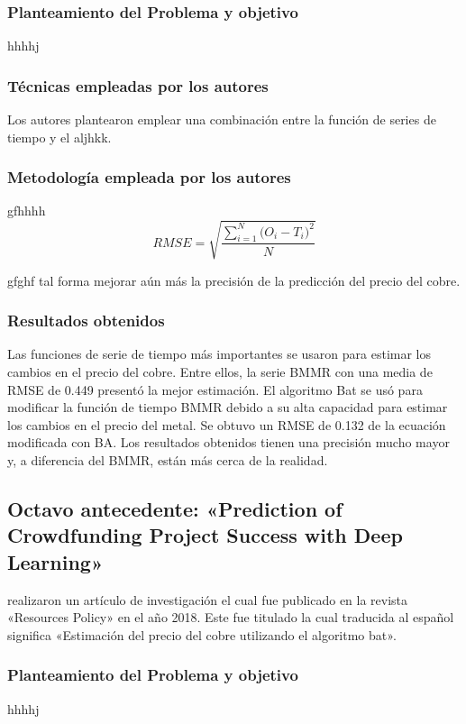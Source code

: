\subsubsection{Planteamiento del Problema y objetivo }
hhhhj

\subsubsection{Técnicas empleadas por los autores}
Los autores plantearon emplear una combinación entre la función de series de tiempo y el aljhkk. 

\subsubsection{Metodología empleada por los autores}
gfhhhh
\begin{equation}  
\label{eq:RMSE}
RMSE = \sqrt{\frac{\sum_{i=1}^{N}{\Big(O_i -T_i\Big)^2}}{N}}
\end{equation}

gfghf tal forma mejorar aún más la precisión de la predicción del precio del cobre.

\subsubsection{Resultados obtenidos}
Las funciones de serie de tiempo más importantes se usaron para estimar los cambios en el precio del cobre. Entre ellos, la serie BMMR con una media de RMSE de 0.449 presentó la mejor estimación. El algoritmo Bat  se usó para modificar la función de tiempo BMMR debido a su alta capacidad para estimar los cambios en el precio del metal. Se obtuvo un RMSE de 0.132 de la ecuación modificada con BA. Los resultados obtenidos tienen una precisión mucho mayor y, a diferencia del BMMR, están más cerca de la realidad.


\subsection{Octavo antecedente: «Prediction of Crowdfunding Project Success with Deep Learning» \citep*{pr_yu2018deeplearning}}
\citeauthor{pr_yu2018deeplearning} realizaron un artículo de investigación el cual fue publicado en la revista «Resources Policy» en el año 2018. Este fue titulado  la cual traducida al español significa «Estimación del precio del cobre utilizando el algoritmo bat».

\subsubsection{Planteamiento del Problema y objetivo }
hhhhj


